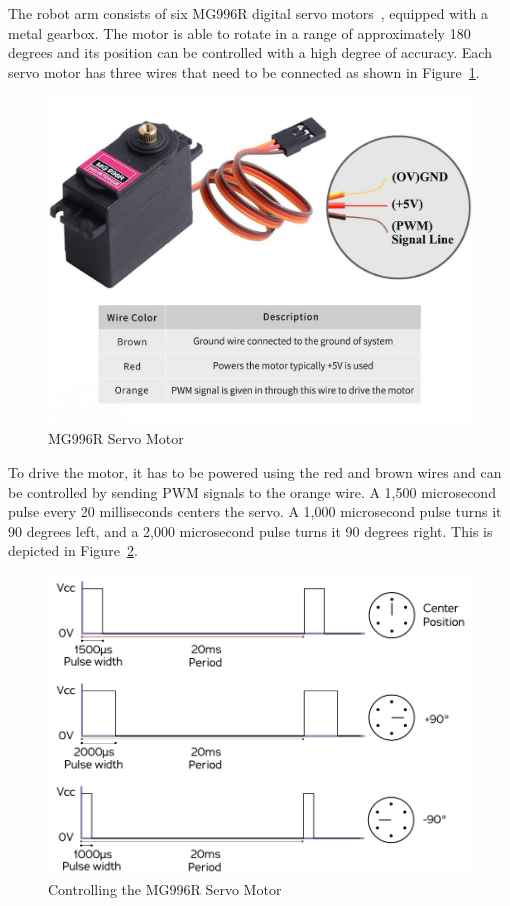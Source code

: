 \documentclass[MMR,Master,english]{twbook}
\begin{document}
\noindent The robot arm consists of six MG996R digital servo motors~\cite{MG996RServoMotor}, equipped with a metal gearbox. The motor is able to rotate in a range of approximately 180 degrees and its position can be controlled with a high degree of accuracy. Each servo motor has three wires that need to be connected as shown in Figure~\ref{fig:servo}.

\begin{figure}[H]
	\centering
	\includegraphics[width=0.7\columnwidth]{img/experiment/servo.jpg}
	\caption[MG996R Servo Motor]{MG996R Servo Motor~\cite{PackMg996rMetal}}
	\label{fig:servo}
\end{figure}

\noindent To drive the motor, it has to be powered using the red and brown wires and can be controlled by sending PWM signals to the orange wire. A 1,500 microsecond pulse every 20 milliseconds centers the servo. A 1,000 microsecond pulse turns it 90 degrees left, and a 2,000 microsecond pulse turns it 90 degrees right. This is depicted in Figure~\ref{fig:servo_angle}.

\begin{figure}[H]
	\centering
	\includegraphics[width=0.7\columnwidth]{img/experiment/servo_angle.png}
	\caption[Controlling the MG996R Servo Motor]{Controlling the MG996R Servo Motor~\cite{twierengEmilyQuadrupedDog}}
	\label{fig:servo_angle}
\end{figure}
\end{document}
